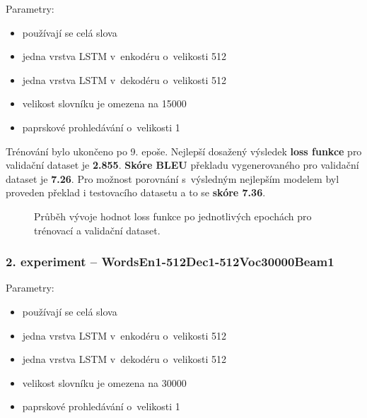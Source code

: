 Parametry:
\begin{itemize}
  \item používají se celá slova
  \item jedna vrstva LSTM v~enkodéru o~velikosti 512
  \item jedna vrstva LSTM v~dekodéru o~velikosti 512
  \item velikost slovníku je omezena na 15000
  \item paprskové prohledávání o~velikosti 1
\end{itemize}

Trénování bylo ukončeno po 9. epoše. Nejlepší dosažený výsledek \textbf{loss funkce} pro validační dataset je \textbf{2.855}. \textbf{Skóre BLEU} překladu vygenerovaného pro validační dataset je \textbf{7.26}. Pro možnost porovnání s~výsledným nejlepším modelem byl proveden překlad i testovacího datasetu a to se \textbf{skóre 7.36}.

\begin{figure}[H]
    \begin{center}
    \end{center}
	\caption{Průběh vývoje hodnot loss funkce po jednotlivých epochách pro trénovací a validační dataset.}
\end{figure}

\subsubsection{2. experiment -- WordsEn1-512Dec1-512Voc30000Beam1}\label{experiment2}
Parametry:
\begin{itemize}
  \item používají se celá slova
  \item jedna vrstva LSTM v~enkodéru o~velikosti 512
  \item jedna vrstva LSTM v~dekodéru o~velikosti 512
  \item velikost slovníku je omezena na 30000
  \item paprskové prohledávání o~velikosti 1
\end{itemize}

